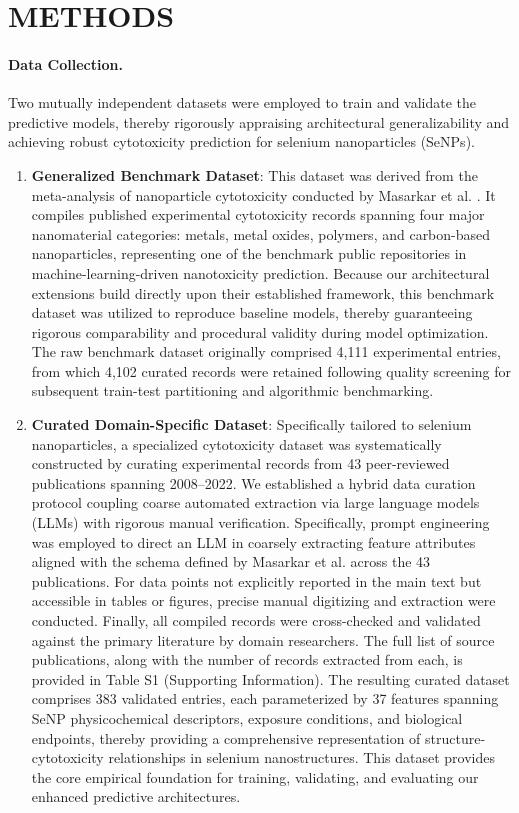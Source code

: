 \section{METHODS}

\paragraph{Data Collection.}
Two mutually independent datasets were employed to train and validate the predictive models, thereby rigorously appraising architectural generalizability and achieving robust cytotoxicity prediction for selenium nanoparticles (SeNPs).

\begin{enumerate}
  \item \textbf{Generalized Benchmark Dataset}: This dataset was derived from the meta-analysis of nanoparticle cytotoxicity conducted by Masarkar et al. \cite{masarkar2024}. It compiles published experimental cytotoxicity records spanning four major nanomaterial categories: metals, metal oxides, polymers, and carbon-based nanoparticles, representing one of the benchmark public repositories in machine-learning-driven nanotoxicity prediction. Because our architectural extensions build directly upon their established framework, this benchmark dataset was utilized to reproduce baseline models, thereby guaranteeing rigorous comparability and procedural validity during model optimization. The raw benchmark dataset originally comprised 4,111 experimental entries, from which 4,102 curated records were retained following quality screening for subsequent train-test partitioning and algorithmic benchmarking.

  \item \textbf{Curated Domain-Specific Dataset}: Specifically tailored to selenium nanoparticles, a specialized cytotoxicity dataset was systematically constructed by curating experimental records from 43 peer-reviewed publications spanning 2008–2022. We established a hybrid data curation protocol coupling coarse automated extraction via large language models (LLMs) with rigorous manual verification. Specifically, prompt engineering was employed to direct an LLM in coarsely extracting feature attributes aligned with the schema defined by Masarkar et al. \cite{masarkar2024} across the 43 publications. For data points not explicitly reported in the main text but accessible in tables or figures, precise manual digitizing and extraction were conducted. Finally, all compiled records were cross-checked and validated against the primary literature by domain researchers. The full list of source publications, along with the number of records extracted from each, is provided in Table S1 (Supporting Information). The resulting curated dataset comprises 383 validated entries, each parameterized by 37 features spanning SeNP physicochemical descriptors, exposure conditions, and biological endpoints, thereby providing a comprehensive representation of structure-cytotoxicity relationships in selenium nanostructures. This dataset provides the core empirical foundation for training, validating, and evaluating our enhanced predictive architectures.
\end{enumerate}

